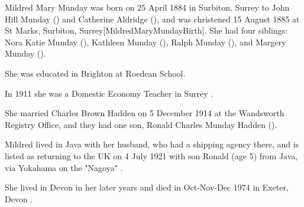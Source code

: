 
Mildred Mary Munday was born on 25 April 1884 in Surbiton, Surrey to  John Hill Munday () and Catherine Aldridge (), and was christened 15 August 1885 at St Marks, Surbiton, Surrey[MildredMaryMundayBirth]. She had four siblings:  Nora Katie Munday (),  Kathleen Munday (), Ralph Munday (), and Margery Munday ().

She was educated in Brighton at Roedean School.

In 1911 she was a Domestic Economy Teacher in Surrey \cite{MildredMundayOccupation}.

She married Charles Brown Hadden on	5 December 1914  at the	Wandsworth Registry Office, and they had one son,  Ronald Charles Munday Hadden ().

Mildred lived in Java with her husband, who had a shipping agency there, and is listed as returning to the UK on 4 July 1921 with son Ronald (age 5) from Java, via Yokahama on the "Nagoya" \cite{MildredMundayTravel}.

She lived in Devon in her later years and died in Oct-Nov-Dec 1974 in	Exeter, Devon \cite{MildredMundayDeath}.
